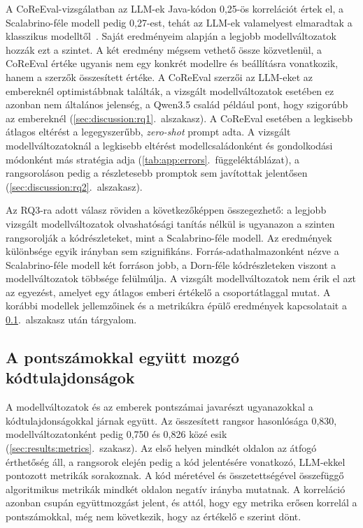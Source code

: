 \documentclass[
]{elteikthesis}[2024/04/26]
\begin{document}
A CoReEval-vizsgálatban az LLM-ek Java-kódon 0,25-ös korrelációt értek el,
a Scalabrino-féle modell pedig 0,27-est, tehát az LLM-ek
valamelyest elmaradtak a klasszikus modelltől~\cite{ouedraogo2025coreeval}.
Saját eredményeim alapján a legjobb modellváltozatok hozzák ezt a szintet.
A két eredmény mégsem vethető össze közvetlenül, a CoReEval értéke ugyanis
nem egy konkrét modellre és beállításra vonatkozik, hanem a szerzők összesített értéke.
A CoReEval szerzői az LLM-eket az embereknél optimistábbnak találták,
a vizsgált modellváltozatok esetében ez azonban nem általános jelenség,
a Qwen3.5 család például pont, hogy szigorúbb az embereknél (\ref{sec:discussion:rq1}.~alszakasz).
A CoReEval esetében a legkisebb átlagos eltérést a legegyszerűbb, \textit{zero-shot} prompt adta.
A vizsgált modellváltozatoknál a legkisebb eltérést modellcsaládonként és gondolkodási módonként más stratégia adja
(\ref{tab:app:errors}.~függeléktáblázat),
a rangsoroláson pedig a részletesebb promptok sem javítottak jelentősen (\ref{sec:discussion:rq2}.~alszakasz).

Az RQ3-ra adott válasz röviden a következőképpen összegezhető:
a legjobb vizsgált modellváltozatok olvashatósági tanítás nélkül is
ugyanazon a szinten rangsorolják a kódrészleteket, mint a Scalabrino-féle modell.
Az eredmények különbsége egyik irányban sem szignifikáns.
Forrás-adathalmazonként nézve a Scalabrino-féle modell két forráson jobb,
a Dorn-féle kódrészleteken viszont a modellváltozatok többsége felülmúlja.
A vizsgált modellváltozatok nem érik el azt az egyezést,
amelyet egy átlagos emberi értékelő a csoportátlaggal mutat.
A korábbi modellek jellemzőinek és a metrikákra épülő eredmények kapcsolatait
a \ref{sec:discussion:rq4}.~alszakasz után tárgyalom.

\subsection{A pontszámokkal együtt mozgó kódtulajdonságok}
\label{sec:discussion:rq4}

A modellváltozatok és az emberek pontszámai javarészt %
ugyanazokkal a kódtulajdonságokkal járnak együtt.
Az összesített rangsor hasonlósága 0,830, modellváltozatonként pedig 0,750 és 0,826 közé esik (\ref{sec:results:metrics}.~szakasz).
Az első helyen mindkét oldalon az átfogó érthetőség áll,
a rangsorok elején pedig a kód jelentésére vonatkozó, LLM-ekkel pontozott metrikák sorakoznak.
A kód méretével és összetettségével összefüggő algoritmikus metrikák
mindkét oldalon negatív irányba mutatnak.
A korreláció azonban csupán együttmozgást jelent, és attól,
hogy egy metrika erősen korrelál a pontszámokkal, még nem következik, hogy az értékelő e szerint dönt.
\end{document}
